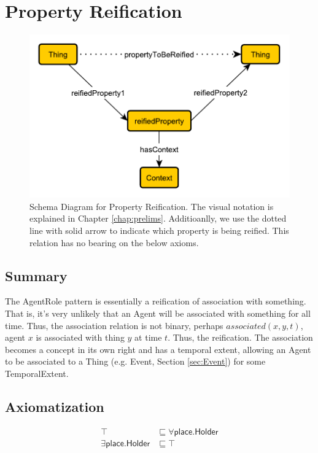 \section{Property Reification}
\label{sec:Property}
\begin{figure}[h!]
\begin{center}
\includegraphics[width=.7\textwidth]{figures/reification}
\end{center}
\caption{Schema Diagram for Property Reification. The visual notation is explained in Chapter \ref{chap:prelims}. Additioanlly, we use the dotted line with solid arrow to indicate which property is being reified. This relation has no bearing on the below axioms.}
\label{fig:Property}
\end{figure}
\subsection{Summary}
\label{sum:Property}
The \textsf{AgentRole} pattern is essentially a reification of association with something. That is, it's very unlikely that an Agent will be associated with something for all time. Thus, the association relation is not binary, perhaps $\textit{associated}(x,y,t)$, agent $x$ is associated with thing $y$ at time $t$. Thus, the reification. The association becomes a concept in its own right and has a temporal extent, allowing an \textsf{Agent} to be associated to a \textsf{Thing} (e.g. \textsf{Event}, Section \ref{sec:Event}) for some \textsf{TemporalExtent}.

\subsection{Axiomatization}
\label{axs:Property}
\begin{align}
\top &\sqsubseteq \forall\textsf{place.Holder} \\ 
\exists\textsf{place.Holder} &\sqsubseteq \top 
\end{align}


